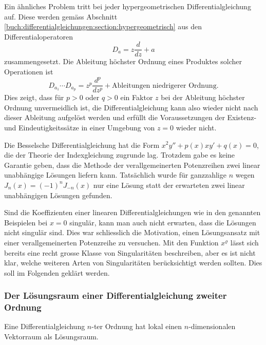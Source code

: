 Ein ähnliches Problem tritt bei jeder hypergeometrischen
Differentialgleichung auf.
Diese werden gemäss Abschnitt
\ref{buch:differentialgleichungen:section:hypergeometrisch}
aus den Differentialoperatoren
\[
D_a=z\frac{d}{dz} + a
\]
zusammengesetzt.
Die Ableitung höchster Ordnung eines Produktes solcher Operationen ist
\[
D_{a_1}
\cdots
D_{a_p}
=
z^p\frac{d^p}{dz^p} + \text{Ableitungen niedrigerer Ordnung}.
\]
Dies zeigt, dass für $p>0$ oder $q>0$ ein Faktor $z$ bei der
Ableitung höchster Ordnung unvermeidlich ist, die Differentialgleichung
kann also wieder nicht nach dieser Ableitung aufgelöst werden und
erfüllt die Voraussetzungen der Existenz- und Eindeutigkeitssätze
in einer Umgebung von $z=0$ wieder nicht.

Die Besselsche Differentialgleichung
hat die Form $x^2y''+p(x)xy'+q(x)=0$, die der Theorie der 
Indexgleichung zugrunde lag.
%
%
Trotzdem gabe es keine Garantie geben, dass die Methode der
verallgemeinerten Potenzreihen zwei linear unabhängige Lösungen
liefern kann.
Tatsächlich wurde für ganzzahlige $n$ wegen $J_n(x) = (-1)^n J_{-n}(x)$
nur eine Lösung statt der erwarteten zwei linear unabhängigen
Lösungen gefunden.

Sind die Koeffizienten einer linearen Differentialgleichungen wie
in den genannten Beispielen bei $x=0$ singulär, kann man auch nicht
erwarten, dass die Lösungen nicht singulär sind.
Dies war schliesslich die Motivation, einen Lösungsansatz mit einer
verallgemeinerten Potenzreihe zu versuchen.
Mit den Funktion $x^\varrho$ lässt sich bereits eine recht grosse
Klasse von Singularitäten beschreiben, aber es ist nicht klar,
welche weiteren Arten von Singularitäten berücksichtigt werden sollten.
Dies soll im Folgenden geklärt werden.

%
%
\subsubsection{Der Lösungsraum einer Differentialgleichung zweiter Ordnung}
Eine Differentialgleichung $n$-ter Ordnung hat lokal einen $n$-dimensionalen
Vektorraum als Lösungsraum.

